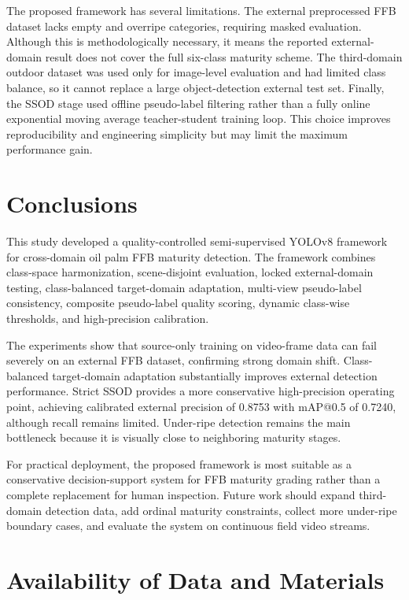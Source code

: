 ﻿\documentclass[12pt]{article}
\begin{document}
The proposed framework has several limitations. The external preprocessed FFB dataset lacks empty and overripe categories, requiring masked evaluation. Although this is methodologically necessary, it means the reported external-domain result does not cover the full six-class maturity scheme. The third-domain outdoor dataset was used only for image-level evaluation and had limited class balance, so it cannot replace a large object-detection external test set. Finally, the SSOD stage used offline pseudo-label filtering rather than a fully online exponential moving average teacher-student training loop. This choice improves reproducibility and engineering simplicity but may limit the maximum performance gain.

\section{Conclusions}

This study developed a quality-controlled semi-supervised YOLOv8 framework for cross-domain oil palm FFB maturity detection. The framework combines class-space harmonization, scene-disjoint evaluation, locked external-domain testing, class-balanced target-domain adaptation, multi-view pseudo-label consistency, composite pseudo-label quality scoring, dynamic class-wise thresholds, and high-precision calibration.

The experiments show that source-only training on video-frame data can fail severely on an external FFB dataset, confirming strong domain shift. Class-balanced target-domain adaptation substantially improves external detection performance. Strict SSOD provides a more conservative high-precision operating point, achieving calibrated external precision of 0.8753 with mAP@0.5 of 0.7240, although recall remains limited. Under-ripe detection remains the main bottleneck because it is visually close to neighboring maturity stages.

For practical deployment, the proposed framework is most suitable as a conservative decision-support system for FFB maturity grading rather than a complete replacement for human inspection. Future work should expand third-domain detection data, add ordinal maturity constraints, collect more under-ripe boundary cases, and evaluate the system on continuous field video streams.

\section*{Availability of Data and Materials}
\end{document}
